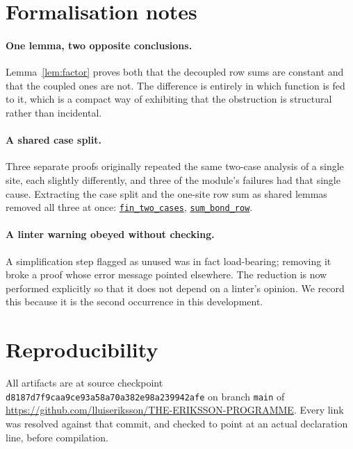 \documentclass[11pt]{article}
\theoremstyle{definition}
\newcommand{\anchor}{d8187d7f9caa9ce93a58a70a382e98a239942afe}
\newcommand{\osline}[3]{%
  \href{https://github.com/lluiseriksson/THE-ERIKSSON-PROGRAMME/blob/\anchor/YangMills/OS/#1.lean\#L#2}{\nolinkurl{#3}}}
\begin{document}
\section{Formalisation notes}

\paragraph{One lemma, two opposite conclusions.}  Lemma~\ref{lem:factor} proves
both that the decoupled row sums are constant and that the coupled ones are not.
The difference is entirely in which function is fed to it, which is a compact
way of exhibiting that the obstruction is structural rather than incidental.

\paragraph{A shared case split.}  Three separate proofs originally repeated the
same two-case analysis of a single site, each slightly differently, and three
of the module's failures had that single cause.  Extracting the case split and
the one-site row sum as shared lemmas removed all three at once:
\osline{SpatialExtent}{60}{fin\_two\_cases},
\osline{SpatialExtent}{65}{sum\_bond\_row}.

\paragraph{A linter warning obeyed without checking.}  A simplification step
flagged as unused was in fact load-bearing; removing it broke a proof whose
error message pointed elsewhere.  The reduction is now performed explicitly so
that it does not depend on a linter's opinion.  We record this because it is the
second occurrence in this development.

\section{Reproducibility}\label{sec:repro}

All artifacts are at source checkpoint \texttt{\anchor} on branch \texttt{main}
of \url{https://github.com/lluiseriksson/THE-ERIKSSON-PROGRAMME}.  Every link
was resolved against that commit, and checked to point at an actual declaration
line, before compilation.
\end{document}
